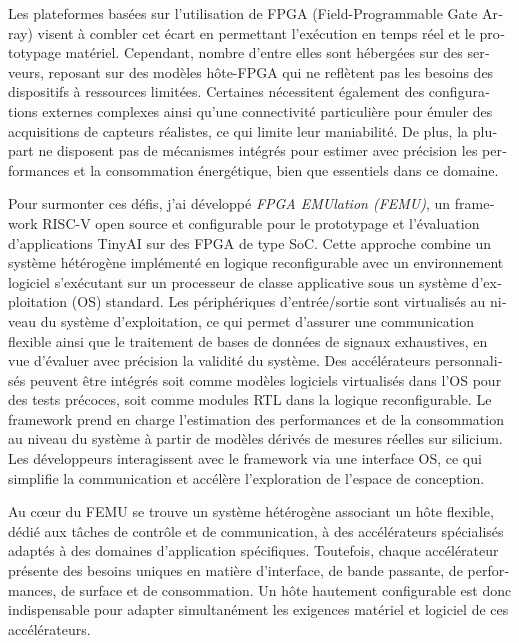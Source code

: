\begin{otherlanguage}{french}
    Les plateformes basées sur l'utilisation de FPGA (Field-Programmable Gate Array) visent à combler cet écart en permettant l’exécution en temps réel et le prototypage matériel. Cependant, nombre d’entre elles sont hébergées sur des serveurs, reposant sur des modèles hôte-FPGA qui ne reflètent pas les besoins des dispositifs à ressources limitées. Certaines nécessitent également des configurations externes complexes ainsi qu’une connectivité particulière pour émuler des acquisitions de capteurs réalistes, ce qui limite leur maniabilité. De plus, la plupart ne disposent pas de mécanismes intégrés pour estimer avec précision les performances et la consommation énergétique, bien que essentiels dans ce domaine.

    \thispagestyle{plain}
    Pour surmonter ces défis, j’ai développé \textit{FPGA EMUlation (\mbox{FEMU})}, un framework RISC-V open source et configurable pour le prototypage et l’évaluation d’applications \mbox{TinyAI} sur des FPGA de type SoC. Cette approche combine un système hétérogène implémenté en logique reconfigurable avec un environnement logiciel s’exécutant sur un processeur de classe applicative sous un système d’exploitation (OS) standard. Les périphériques d’entrée/sortie sont virtualisés au niveau du système d’exploitation, ce qui permet d’assurer une communication flexible ainsi que le traitement de bases de données de signaux exhaustives, en vue d’évaluer avec précision la validité du système. Des accélérateurs personnalisés peuvent être intégrés soit comme modèles logiciels virtualisés dans l’OS pour des tests précoces, soit comme modules RTL dans la logique reconfigurable. Le framework prend en charge l’estimation des performances et de la consommation au niveau du système à partir de modèles dérivés de mesures réelles sur silicium. Les développeurs interagissent avec le framework via une interface OS, ce qui simplifie la communication et accélère l’exploration de l’espace de conception.
    
    Au cœur du \mbox{FEMU} se trouve un système hétérogène associant un hôte flexible, dédié aux tâches de contrôle et de communication, à des accélérateurs spécialisés adaptés à des domaines d’application spécifiques. Toutefois, chaque accélérateur présente des besoins uniques en matière d'interface, de bande passante, de performances, de surface et de consommation. Un hôte hautement configurable est donc indispensable pour adapter simultanément les exigences matériel et logiciel de ces accélérateurs.
    

\end{otherlanguage}

